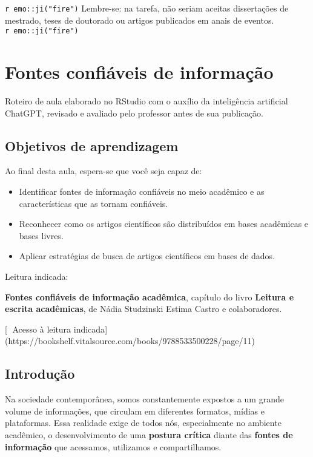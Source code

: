 \documentclass[
  letterpaper,
  DIV=11,
  numbers=noendperiod]{scrreprt}
\begin{document}
\texttt{r\ emo::ji("fire")} Lembre-se: na tarefa, não seriam aceitas
dissertações de mestrado, teses de doutorado ou artigos publicados em
anais de eventos. \texttt{r\ emo::ji("fire")}

\chapter{Fontes confiáveis de
informação}\label{fontes-confiuxe1veis-de-informauxe7uxe3o}

Roteiro de aula elaborado no RStudio com o auxílio da inteligência
artificial ChatGPT, revisado e avaliado pelo professor antes de sua
publicação.

\section{Objetivos de aprendizagem}\label{objetivos-de-aprendizagem-5}

Ao final desta aula, espera-se que você seja capaz de:

\begin{itemize}
\item
  Identificar fontes de informação confiáveis no meio acadêmico e as
  características que as tornam confiáveis.
\item
  Reconhecer como os artigos científicos são distribuídos em bases
  acadêmicas e bases livres.
\item
  Aplicar estratégias de busca de artigos científicos em bases de dados.
\end{itemize}

\label{Leitura}
Leitura indicada:

\textbf{Fontes confiáveis de informação acadêmica}, capítulo do livro
\textbf{Leitura e escrita acadêmicas}, de Nádia Studzinski Estima Castro
e colaboradores.

{[}🔗 Acesso à leitura
indicada{]}(https://bookshelf.vitalsource.com/books/9788533500228/page/11)

\section{Introdução}\label{introduuxe7uxe3o-4}

Na sociedade contemporânea, somos constantemente expostos a um grande
volume de informações, que circulam em diferentes formatos, mídias e
plataformas. Essa realidade exige de todos nós, especialmente no
ambiente acadêmico, o desenvolvimento de uma \textbf{postura crítica}
diante das \textbf{fontes de informação} que acessamos, utilizamos e
compartilhamos.
\end{document}
